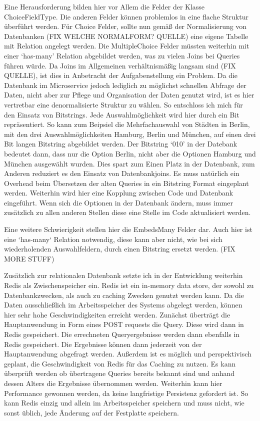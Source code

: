 Eine Herausforderung bilden hier vor Allem die Felder der Klasse ChoiceFieldType. Die anderen Felder können problemlos in eine flache Struktur überführt werden. Für Choice Felder, sollte nun gemäß der Normalisierung von Datenbanken (FIX WELCHE NORMALFORM? QUELLE) eine eigene Tabelle mit Relation angelegt werden. Die MultipleChoice Felder müssten weiterhin mit einer `has-many' Relation abgebildet werden, was zu vielen Joins bei Queries führen würde. Da Joins im Allgemeinen verhältnismäßig langsam sind (FIX QUELLE), ist dies in Anbetracht der Aufgabenstellung ein Problem. Da die Datenbank im Microservice jedoch lediglich zu möglichst schnellen Abfrage der Daten, nicht aber zur Pflege und Organisation der Daten genutzt wird, ist es hier vertretbar eine denormalisierte Struktur zu wählen. So entschloss ich mich für den Einsatz von Bitstrings. Jede Auswahlmöglichkeit wird hier durch ein Bit repräsentiert. So kann zum Beipsiel die Mehrfachauswahl von Städten in Berlin, mit den drei Auswahlmöglichkeiten Hamburg, Berlin und München, auf einen drei Bit langen Bitstring abgebildet werden. Der Bitstring `010' in der Datebank bedeutet dann, dass nur die Option Berlin, nicht aber die Optionen Hamburg und München ausgewählt wurden. Dies spart zum Einen Platz in der Datenbank, zum Anderen reduziert es den Einsatz von Datenbankjoins. Es muss natürlich ein Overhead beim Übersetzen der alten Queries in ein Bitstring Format eingeplant werden. Weiterhin wird hier eine Kopplung zwischen Code und Datenbank eingeführt. Wenn sich die Optionen in der Datenbank ändern, muss immer zusätzlich zu allen anderen Stellen diese eine Stelle im Code aktualisiert werden.

Eine weitere Schwierigkeit stellen hier die EmbedsMany Felder dar. Auch hier ist eine `has-many` Relation notwendig, diese kann aber nicht, wie bei sich wiederholenden Auswahlfeldern, durch einen Bitstring ersetzt werden. (FIX MORE STUFF)


Zusätzlich zur relationalen Datenbank setzte ich in der Entwicklung weiterhin Redis\cite{redis} als Zwischenspeicher ein. Redis ist ein in-memory data store, der sowohl zu Datenbankzwecken, als auch zu caching Zwecken genutzt werden kann. Da die Daten ausschließlich im Arbeitsspeicher des Systems abgelegt werden, können hier sehr hohe Geschwindigkeiten erreicht werden.
Zunächst überträgt die Hauptanwendung in Form eines POST requests die Query. Diese wird dann in Redis gespeichert. Die errechneten Queryergebnisse werden dann ebenfalls in Redis gespeichert. Die Ergebnisse können dann jederzeit von der Hauptanwendung abgefragt werden. Außerdem ist es möglich und perspektivisch geplant, die Geschwindigkeit von Redis für das Caching zu nutzen. Es kann überprüft werden ob übertragene Queries bereits bekannt sind und anhand dessen Alters die Ergebnisse übernommen werden. Weiterhin kann hier Performance gewonnen werden, da keine langfristige Persistenz gefordert ist. So kann Redis einzig und allein im Arbeitsspeicher speichern und muss nicht, wie sonst üblich, jede Änderung auf der Festplatte speichern.\cite{redis:faq}

